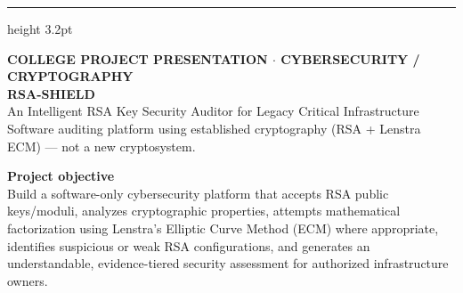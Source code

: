 \documentclass[12pt,landscape]{article}
\newenvironment{slidepage}{%
  \noindent\begin{minipage}[t][\dimexpr\textheight-0.35cm\relax][s]{\textwidth}%
}{\end{minipage}\newpage}
\begin{document}
\begin{slidepage}
{\color{cyan}\hrule height 3.2pt}\vspace{0.3cm}
{\normalsize\bfseries\color{cyan}COLLEGE PROJECT PRESENTATION $\cdot$ CYBERSECURITY / CRYPTOGRAPHY}\\[0.4em]
{\fontsize{32}{36}\selectfont\bfseries\color{ink}RSA-SHIELD}\\[0.25em]
{\Large\color{body}An Intelligent RSA Key Security Auditor for Legacy Critical Infrastructure}\\[0.25em]
{\normalsize\color{muted}Software auditing platform using established cryptography (RSA + Lenstra ECM) --- not a new cryptosystem.}
\vspace{\fill}

\begin{minipage}[t]{0.58\textwidth}

\vspace{0.5cm}
{\Large\bfseries Project objective}\\[0.25em]
{\normalsize\color{body}Build a software-only cybersecurity platform that accepts RSA public keys/moduli, analyzes cryptographic properties, attempts mathematical factorization using Lenstra's Elliptic Curve Method (ECM) where appropriate, identifies suspicious or weak RSA configurations, and generates an understandable, evidence-tiered security assessment for authorized infrastructure owners.}


\end{minipage}
\end{slidepage}
\end{document}
